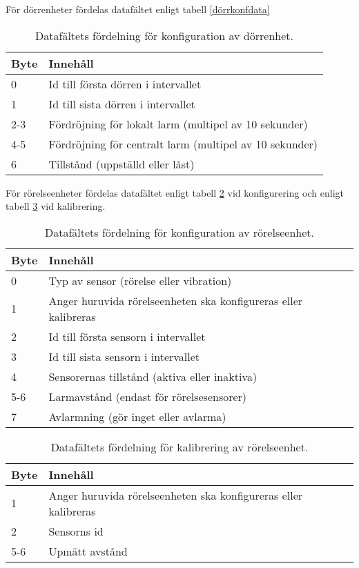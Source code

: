 För dörrenheter fördelas datafältet enligt tabell \ref{dörrkonfdata}

\begin{table}[htb]
	\centering
	\begin{tabular}{|l|l|}
		\hline
		Byte & Innehåll \\ \hline \hline
		0 & Id till första dörren i intervallet \\ \hline
		1 & Id till sista dörren i intervallet \\ \hline
		2-3 & Fördröjning för lokalt larm (multipel av 10 sekunder) \\ \hline
		4-5 & Fördröjning för centralt larm (multipel av 10 sekunder) \\ \hline
		6 & Tillstånd (uppställd eller låst) \\ \hline
	\end{tabular}
	\caption{Datafältets fördelning för konfiguration av dörrenhet.}
	\label{tab:dörrkonfdata}
\end{table}



För rörelseenheter fördelas datafältet enligt tabell \ref{tab:rörelsekonfdata} vid konfigurering och enligt tabell \ref{tab:rörelsekaldata} vid kalibrering.
\begin{table}[htb]
	\centering
	\begin{tabular}{|l|l|}
		\hline
		Byte & Innehåll \\ \hline \hline
		0 & Typ av sensor (rörelse eller vibration) \\ \hline
		1 & Anger huruvida rörelseenheten ska konfigureras eller kalibreras \\ \hline
		2 & Id till första sensorn i intervallet \\ \hline
		3 & Id till sista sensorn i intervallet \\ \hline
		4 & Sensorernas tillstånd (aktiva eller inaktiva) \\ \hline
		5-6 & Larmavstånd (endast för rörelsesensorer) \\ \hline
		7 & Avlarmning (gör inget eller avlarma) \\ \hline
	\end{tabular}
	\caption{Datafältets fördelning för konfiguration av rörelseenhet.}
	\label{tab:rörelsekonfdata}
\end{table}

\begin{table}[htb]
	\centering
	\begin{tabular}{|l|l|}
		\hline
		Byte & Innehåll \\ \hline \hline
		1 & Anger huruvida rörelseenheten ska konfigureras eller kalibreras \\ \hline
		2 & Sensorns id\\ \hline
		5-6 & Upmätt avstånd\\ \hline
	\end{tabular}
	\caption{Datafältets fördelning för kalibrering av rörelseenhet.}
	\label{tab:rörelsekaldata}
\end{table}



